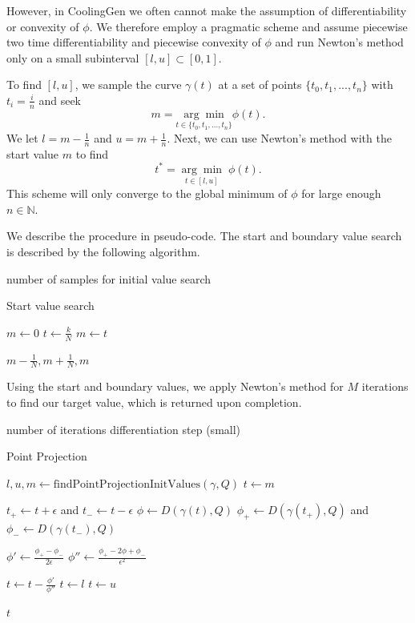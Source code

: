 \documentclass[a4paper, 11pt]{report}
\theoremstyle{definition}
\newcommand{\Desc}[2]{\State \makebox[12em][l]{#1}#2}
\begin{document}
	However, in CoolingGen we often cannot make the assumption of differentiability or convexity of $\phi$. We therefore employ a pragmatic scheme and assume piecewise two time differentiability and piecewise convexity of $\phi$ and run Newton's method only on a small subinterval $[l,u] \subset [0,1]$.

	To find $[l,u]$, we sample the curve $\gamma(t)$ at a set of points $\{t_0, t_1, ..., t_n\}$ with $t_i = \frac{i}{n}$ and seek
		$$ m = \underset{t\in\{t_0, t_1, ..., t_n\}}{\arg\min} \phi(t). $$
	We let $l = m - \frac{1}{n}$ and $u = m + \frac{1}{n}$. Next, we can use Newton's method with the start value $m$ to find
		$$ t^* = \underset{t\in[l,u]}{\arg\min}\;\phi(t). $$
	This scheme will only converge to the global minimum of $\phi$ for large enough $n \in \mathbb{N}$.

	We describe the procedure in pseudo-code. The start and boundary value search is described by the following algorithm.
	\begin{algorithm}[H]
		\begin{algorithmic}[1]
			\Input
				\Desc{$N$}{number of samples for initial value search}
			\EndInput
			
			\caption{Start value search}

				\State $m \gets 0$
					\State $t \gets \frac{k}{N}$
						$m \gets t$
					\EndIf
				\EndFor

				\State \Return $m-\frac{1}{N}, m+\frac{1}{N}, m$
			\EndProcedure
		\end{algorithmic}
	\end{algorithm}
	Using the start and boundary values, we apply Newton's method for $M$ iterations to find our target value, which is returned upon completion.
	\begin{algorithm}[H]
		\begin{algorithmic}[1]
			\Input
				\Desc{$M$}{number of iterations}
				\Desc{$\epsilon > 0$}{differentiation step (small)}
			\EndInput

			\caption{Point Projection}\label{alg:pointinversion}
			\Procedure{pointProjection}{$\gamma, Q$}
				\State $l, u, m \gets \text{findPointProjectionInitValues}(\gamma, Q)$
				\State $t \gets m$

				\For {$k = 1, 2,..., M$}
					\State $t_+ \gets t + \epsilon$ and $t_- \gets t - \epsilon$
					\State $\phi \gets D(\gamma(t), Q)$
					\State $\phi_+ \gets D(\gamma(t_+), Q)$ and $\phi_- \gets D(\gamma(t_-), Q)$

					\State $\phi' \gets \frac{\phi_+ - \phi_-}{2\epsilon}$
					\State $\phi'' \gets \frac{\phi_+ - 2\phi + \phi_-}{\epsilon^2}$
					
					\State $t \gets t - \frac{\phi'}{\phi''}$
					 $t \gets l$ \EndIf
					 $t \gets u$ \EndIf

				\EndFor

				\State \Return $t$
			\EndProcedure
		\end{algorithmic}
	\end{algorithm}
\end{document}
